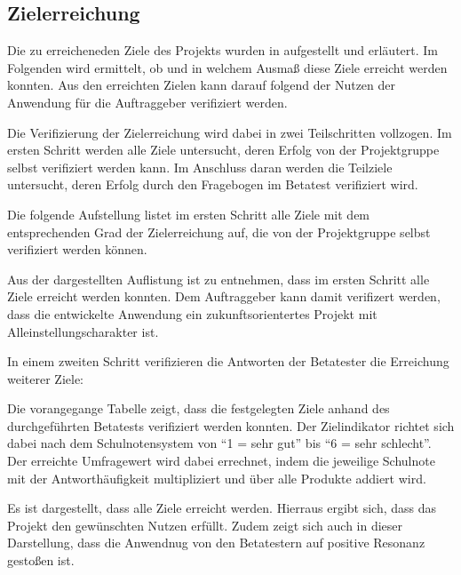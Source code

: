 \subsection{Zielerreichung}
\label{sec:Zielerreichung}

Die zu erreicheneden Ziele des Projekts wurden in  aufgestellt und erläutert. Im Folgenden
wird ermittelt, ob und in welchem Ausmaß diese Ziele erreicht werden konnten.
Aus den erreichten Zielen kann darauf folgend der Nutzen der Anwendung für die Auftraggeber verifiziert werden.

Die Verifizierung der Zielerreichung wird dabei in zwei Teilschritten vollzogen. Im ersten Schritt werden alle
Ziele untersucht, deren Erfolg von der Projektgruppe selbst verifiziert werden kann. Im Anschluss daran werden
die Teilziele untersucht, deren Erfolg durch den Fragebogen im Betatest verifiziert wird.

Die folgende Aufstellung listet im ersten Schritt alle Ziele mit dem entsprechenden Grad der Zielerreichung auf,
die von der Projektgruppe selbst verifiziert werden können.


Aus der dargestellten Auflistung ist zu entnehmen, dass im ersten Schritt alle Ziele erreicht werden konnten.
Dem Auftraggeber kann damit verifizert werden, dass die entwickelte Anwendung ein zukunftsorientertes Projekt mit
Alleinstellungscharakter ist.

In einem zweiten Schritt verifizieren die Antworten der Betatester die Erreichung weiterer Ziele:


Die vorangegange Tabelle zeigt, dass die festgelegten Ziele anhand des durchgeführten 
Betatests verifiziert werden konnten.
Der Zielindikator richtet sich dabei nach dem Schulnotensystem von "`1 = sehr gut"' bis "`6 = sehr schlecht"'.
Der erreichte Umfragewert wird dabei errechnet, indem die jeweilige Schulnote mit 
der Antworthäufigkeit multipliziert und über alle Produkte addiert wird.

Es ist dargestellt, dass alle Ziele erreicht werden. Hierraus ergibt sich, dass das Projekt 
den gewünschten Nutzen erfüllt.
Zudem zeigt sich auch in dieser Darstellung, dass die Anwendnug von den Betatestern
auf positive Resonanz gestoßen ist.